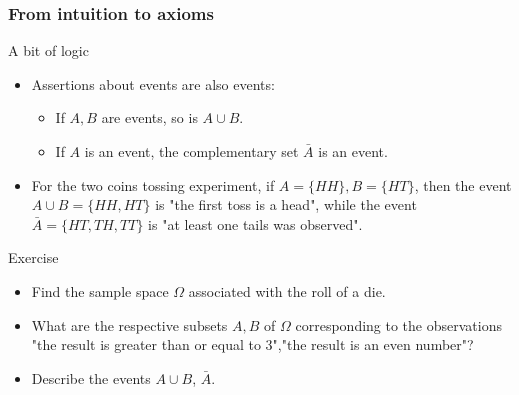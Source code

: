 \begin{frame}
    \frametitle{From intuition to axioms}
\begin{block}{A bit of logic}
    \begin{itemize}
        \item<+-> Assertions about events are also events:
        \begin{itemize}
            \item<+-> If $A,B$ are events, so is $A \cup B.$
            \item<+-> If $A$ is an event, the complementary set $\bar{A}$ is an event.
        \end{itemize}
        \item<+-> For the two coins tossing experiment, if $A=\{HH\},B=\{HT\}$, then
         the event $A \cup B = \{HH, HT\}$ is "the first toss is a head", while the event
        $\bar{A}=\{HT,TH,TT\}$ is "at least one tails was observed".
    \end{itemize}
\end{block}
\begin{block}{Exercise}
    \begin{itemize}
        \item<+-> Find the sample space $\Omega$ associated with the roll of a die.
        \item<+-> What are the respective subsets $A,B$ of $\Omega$ corresponding to the observations
        "the result is greater than or equal to 3","the result is an even number"?
        \item<+-> Describe the events $A\cup B$, $\bar{A}.$
    \end{itemize}
\end{block}
\end{frame}
